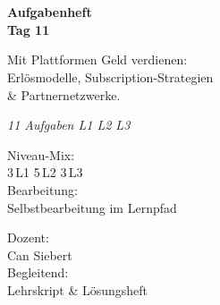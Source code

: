 \documentclass[11pt,a4paper,oneside]{article}
\newcommand{\caveatfontfallback}{\itshape}
\newcommand\caveatfont{\caveatfontfallback}%
\begin{document}
\begin{titlepage}
  \pagestyle{empty}
  \vspace*{1.5cm}
  \\[2pt]
  \noindent{\color{lpAccent}\rule{\linewidth}{1.2pt}}\\[4pt]

  \vspace{3cm}
  {\sffamily\fontsize{30}{34}\selectfont\bfseries\color{lpInk}Aufgabenheft\\Tag 11\par}

  \vspace{0.7cm}
  {\sffamily\large\color{lpGray}Mit Plattformen Geld verdienen:\\Erlösmodelle, Subscription-Strategien\\\& Partnernetzwerke.\par}

  \vspace{1.5cm}
  {\caveatfont\LARGE\color{lpAmber}11 Aufgaben \textperiodcentered{} L1 \textperiodcentered{} L2 \textperiodcentered{} L3}\par

  \vfill

  \noindent\begin{minipage}{0.55\linewidth}
    {\sffamily\footnotesize\color{lpGray}Niveau-Mix:}\\
    {\sffamily\small\color{lpInk}3\,\textsf{L1} \textperiodcentered{} 5\,\textsf{L2} \textperiodcentered{} 3\,\textsf{L3}}\\[10pt]
    {\sffamily\footnotesize\color{lpGray}Bearbeitung:}\\
    {\sffamily\small\color{lpInk}Selbstbearbeitung im Lernpfad}
  \end{minipage}\hfill
  \begin{minipage}{0.4\linewidth}
    \raggedleft
    {\sffamily\footnotesize\color{lpGray}Dozent:}\\
    {\sffamily\small\color{lpInk}Can Siebert}\\[10pt]
    {\sffamily\footnotesize\color{lpGray}Begleitend:}\\
    {\sffamily\small\color{lpInk}Lehrskript \& Lösungsheft}
  \end{minipage}

  \vspace{0.5cm}
  \noindent{\color{lpAccent}\rule{\linewidth}{0.6pt}}
\end{titlepage}
\end{document}
